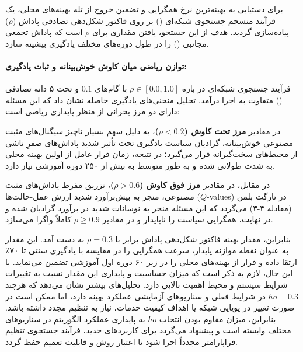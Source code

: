 \documentclass[oneside,openany,phd]{TMU-Thesis}
\begin{document}
\label{subsec:hyperparameter_tuning_rho}

برای دستیابی به بهینه‌ترین نرخ همگرایی و تضمین خروج از تله بهینه‌های محلی، یک فرآیند منسجم جستجوی شبکه‌ای () بر روی فاکتور شکل‌دهی تصادفی پاداش ($\rho$) پیاده‌سازی گردید. هدف از این جستجو، یافتن مقداری برای $\rho$ است که پاداش تجمعی مجانبی () را در طول دوره‌های مختلف یادگیری بیشینه سازد.



\paragraph{توازن ریاضی میان کاوش خوش‌بینانه و ثبات یادگیری:}

فرآیند جستجوی شبکه‌ای در بازه $\rho \in [0.0, 1.0]$ با گام‌های $0.1$ و تحت ۵ دانه تصادفی () متفاوت به اجرا درآمد. تحلیل منحنی‌های یادگیری حاصله نشان داد که این مسئله دارای دو مرز بحرانی از منظر پایداری ریاضی است:

در مقادیر \textbf{مرز تحت کاوش ($\rho < 0.2$)}، به دلیل سهم بسیار ناچیز سیگنال‌های مثبت مصنوعی خوش‌بینانه، گرادیان سیاست یادگیری تحت تأثیر شدید پاداش‌های صفرِ ناشی از محیط‌های سخت‌گیرانه قرار می‌گیرد؛ در نتیجه، زمان فرار عامل از اولین بهینه محلی به شدت طولانی شده و به طور متوسط به بیش از ۲۵۰ دوره آموزشی نیاز دارد.

در مقابل، در مقادیر \textbf{مرز فوق کاوش ($\rho > 0.6$)}، تزریق مفرط پاداش‌های مثبت مصنوعی، منجر به بیش‌برآورد شدید ارزش عمل-حالت‌ها ($Q$-values) در تارگت بلمن (معادله ۴-۳) می‌گردد که این مسئله منجر به نوسانات شدید در برآورد گرادیان شده و در نهایت، همگرایی سیاست را ناپایدار و در مقادیر $\rho \geq 0.9$ کاملاً واگرا می‌سازد.

بنابراین، مقدار بهینه فاکتور شکل‌دهی پاداش برابر با $\rho = 0.3$ به دست آمد. این مقدار به عنوان نقطه موازنه پایدار، سرعت همگرایی را در مقایسه با یادگیری سنتی تا ۷۰٪ ارتقا داده و فرار از بهینه‌های محلی را در زیر ۶۰ دوره اول آموزشی تضمین می‌نماید. با این حال، لازم به ذکر است که میزان حساسیت و پایداری این مقدار نسبت به تغییرات شرایط سیستم و محیط اهمیت بالایی دارد. تحلیل‌های بیشتر نشان می‌دهد که هرچند $

ho=0.3$ در شرایط فعلی و سناریوهای آزمایشی عملکرد بهینه دارد، اما ممکن است در صورت تغییر در پویایی شبکه یا اهداف کیفیت خدمات، نیاز به تنظیم مجدد داشته باشد. بنابراین، میزان مقاوم بودن انتخاب $

ho$ به پایداری عملکرد الگوریتم در سناریوهای مختلف وابسته است و پیشنهاد می‌گردد برای کاربردهای جدید، فرآیند جستجوی تنظیم فراپارامتر مجدداً اجرا شود تا اعتبار روش و قابلیت تعمیم حفظ گردد.
\end{document}
